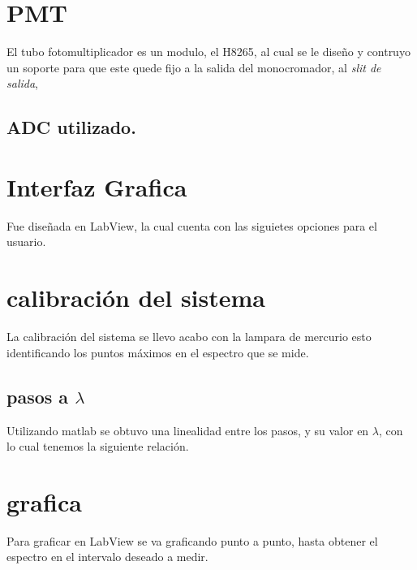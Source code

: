 
\section{PMT}
El tubo fotomultiplicador es un modulo, el H8265, al cual se le diseño y contruyo un soporte para que este quede fijo a la salida del monocromador, al \textit{slit de salida},


\subsection{ADC utilizado.}

\section{Interfaz Grafica}
Fue diseñada en LabView, la cual cuenta con las siguietes opciones para el usuario.
\section{calibración del sistema}
La calibración del sistema se llevo acabo con la lampara de mercurio esto identificando los puntos máximos en el espectro que se mide.

\subsection{pasos a $\lambda$}
Utilizando matlab se obtuvo una linealidad entre los pasos, y su valor en $\lambda$, con lo cual tenemos la siguiente relación.
\section{grafica}

Para graficar en LabView se va graficando punto a punto, hasta obtener el espectro en el intervalo deseado a medir.